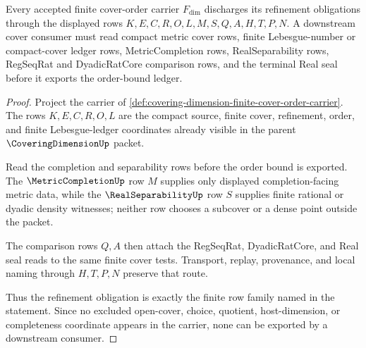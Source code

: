 \begin{theorem}
\label{thm:covering-dimension-finite-refinement-obligations}
Every accepted finite cover-order carrier $F_{\dim}$ discharges its refinement obligations through the displayed rows $K,E,C,R,O,L,M,S,Q,A,H,T,P,N$. A downstream cover consumer must read compact metric cover rows, finite Lebesgue-number or compact-cover ledger rows, MetricCompletion rows, RealSeparability rows, RegSeqRat and DyadicRatCore comparison rows, and the terminal Real seal before it exports the order-bound ledger.
\end{theorem}
\begin{proof}
Project the carrier of \autoref{def:covering-dimension-finite-cover-order-carrier}. The rows $K,E,C,R,O,L$ are the compact source, finite cover, refinement, order, and finite Lebesgue-ledger coordinates already visible in the parent $\CoveringDimensionUp$ packet.

Read the completion and separability rows before the order bound is exported. The $\MetricCompletionUp$ row $M$ supplies only displayed completion-facing metric data, while the $\RealSeparabilityUp$ row $S$ supplies finite rational or dyadic density witnesses; neither row chooses a subcover or a dense point outside the packet.

The comparison rows $Q,A$ then attach the RegSeqRat, DyadicRatCore, and Real seal reads to the same finite cover tests. Transport, replay, provenance, and local naming through $H,T,P,N$ preserve that route.

Thus the refinement obligation is exactly the finite row family named in the statement. Since no excluded open-cover, choice, quotient, host-dimension, or completeness coordinate appears in the carrier, none can be exported by a downstream consumer.
\end{proof}

